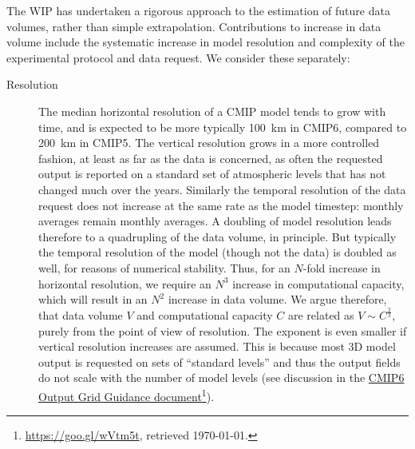 \documentclass[gmd,manuscript]{copernicus}
\newcommand{\pllabel}[1]{\label{p-#1}\linelabel{l-#1}}
\newcommand{\urlref}[2] {\href{#1}{#2}\footnote{\url{#1}, retrieved \today.}}
\begin{document}
The WIP has undertaken a rigorous approach to the estimation of future
data volumes, rather than simple extrapolation. Contributions to
increase in data volume include the systematic increase in model
resolution and complexity of the experimental protocol and data
request. We consider these separately:

\begin{description}
\item[Resolution] The median horizontal resolution of a CMIP model
  tends to grow with time, and is expected to be more typically 100~km
  in CMIP6, compared to 200~km in CMIP5. The vertical resolution grows
  in a more controlled fashion, at least as far as the data is
  concerned, as often the requested output is reported on a standard
  set of atmospheric levels that has not changed much over the years.
  Similarly the temporal resolution of the data request does not
  increase at the same rate as the model timestep: monthly averages
  remain monthly averages. A doubling of model resolution leads
  therefore to a quadrupling of the data volume, in principle. But
  typically the temporal resolution of the model (though not the data)
  is doubled as well, for reasons of numerical stability. Thus, for an
  $N$-fold increase in horizontal resolution, we require an $N^3$
  increase in computational capacity, which will result in an $N^2$
  increase in data volume. We argue therefore, that data volume $V$
  and computational capacity $C$ are related as $V \sim C^\frac23$,
  purely from the point of view of resolution. The exponent is even
  smaller if vertical resolution increases are assumed.
  \pllabel{RC1-18}
  This is because most 3D model output is requested on sets of
  ``standard levels'' and thus the output fields do not scale with the
  number of model levels (see discussion in the
  \urlref{https://goo.gl/wVtm5t}{CMIP6 Output Grid Guidance
    document}).
  

\end{description}
\end{document}
